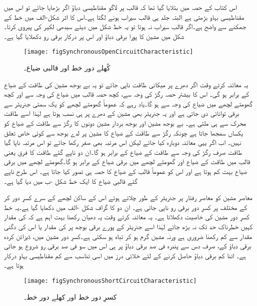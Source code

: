 اس کتاب کے حصہ  میں بتلایا گیا تھا کہ قالب پر لاگو مقناطیسی دباؤ اگر بڑھایا جائے تو اس میں مقناطیسی بہاو بڑھتی ہے البتہ جلد ہی قالب سیراب ہونے لگتا ہے۔اس کا اثر شکل-الف میں خط کے جھکنے سے واضح ہے۔اگر قالب سیراب نہ ہوتا تو یہ خط شکل میں دیئے سیدھی لکیر کی پیروی کرتا۔شکل میں مشین کا پورا برقی دباؤ اور اس  پر درکار برقی رو  دکھلایا گیا ہے۔
\begin{figure}
\centering
\texttt{[image: figSynchronousOpenCircuitCharacteristic]}
\caption{کُھلے دور خط اور قالبی ضیاع۔}
\label{شکل_معاصر_کھلے_دور_خط}
\end{figure}

یہ معائنہ کرتے وقت اگر دھرے پر میکانی طاقت  ناپی جائے تو یہ بے بوجھ مشین کی طاقت کے ضیاع کے برابر ہو گی۔ اس کا بیشتر حصہ رگڑ کی وجہ سے، کچھ حصہ قالب میں ضیاع کی وجہ سے اور کچھ گھومتے لچھے میں ضیاع کی وجہ سے ہو گا۔یاد رہے کہ عموماً گھومتے لچھے کو یک سمتی جنریٹر سے برقی توانائی دی جاتی ہے اور یہ جنریٹر بھی مشین کے دھرے پر ہی نسب ہوتا ہے لہٰذا اسے طاقت محرک سے ہی ملتی ہے۔ بے بوجھ مشین اور بوجھ بردار مشین دونوں کا رگڑ سے طاقت کے ضیاع کو یکساں سمجھا جاتا ہے چونکہ رگڑ سے طاقت کے ضیاع کا مشین پر لدے بوجھ سے کوئی خاص تعلق نہیں۔ اب اگر یہی معائنہ دوبارہ کیا جائے لیکن اس مرتبہ  بھی صفر رکھا جائے تو اس مرتبہ ناپا گیا طاقت  صرف رگڑ کی وجہ سے طاقت کے ضیاع کے برابر ہو گا۔ان دو ناپے گئے طاقت کا فرق یعنی  قالب میں طاقت کے ضیاع  اور گھومتے لچھے میں برقی ضیاع کے برابر ہو گا۔گھومتے لچھے میں برقی ضیاع بہت کم ہوتا ہے اور اس کو عموماً قالب کے ضیاع کا حصہ ہی تصور کیا جاتا ہے۔ اس طرح ناپے گئے قالبی ضیاع کا ایک خط شکل  -ب میں دیا گیا ہے۔

معاصر مشین کو معاصر رفتار پر جنریٹر کے طور چلاتے ہوئے اس کے ساکن لچھے کے سرے کسرِ دور کر کے مختلف  پر کسرِ دور برقی رو  ناپی جاتی ہے۔ ان دو کا گراف شکل -الف میں دکھایا گیا ہے۔یہ خط کسرِ دور مشین کی خاصیت دکھلاتا ہے۔  یہ معائنہ کرتے وقت یہ دھیان رکھنا بہت اہم ہے کہ  کی مقدار کہیں خطرناک حد تک نہ بڑھ جائے لہٰذا اسے جنریٹر کے پورے برقی بوجھ پر  کی مقدار  یا اس کی دگنی مقدار سے کم رکھنا ضروری ہے ورنہ مشین گرم ہو کر تباہ ہو سکتی ہے۔کسرِ دور مشین میں، ڈیزائن کردہ برقی دباؤ کے، صرف دس سے پندرہ فی صد برقی دباؤ پر ہی اس میں سو فی صد برقی رو شروع ہو جاتی ہے۔ اتنا کم برقی دباؤ حاصل کرنے کے لئے خلائی درز میں اسی تناسب سے  کم مقناطیسی بہاو درکار ہوتا ہے۔ 
\begin{figure}
\centering
\texttt{[image: figSynchronousShortCircuitCharacteristic]}
\caption{کسرِ دور خط اور کھلے دور خط۔}
\label{شکل_معاصر_کسر_دور_اور_کھلے_دور_خط}
\end{figure}

